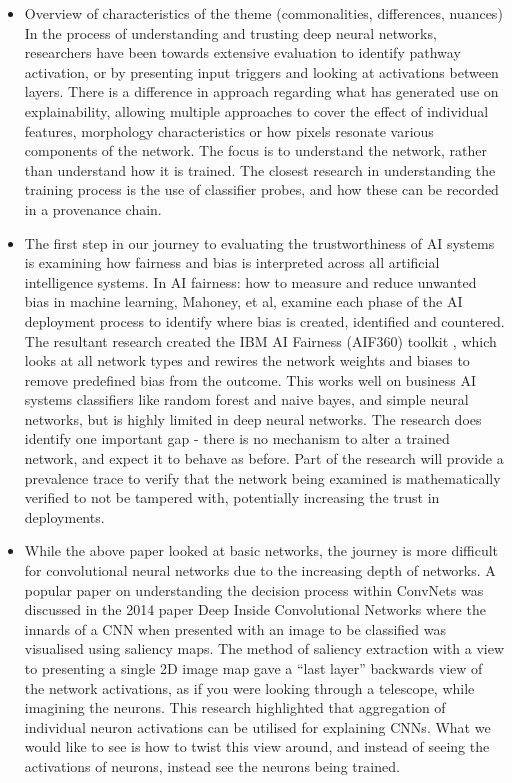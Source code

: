 \begin{itemize}
    \item Overview of characteristics of the theme (commonalities, differences, nuances)
    In the process of understanding and trusting deep neural networks, researchers have been towards extensive evaluation to identify pathway activation, or by presenting input triggers and looking at activations between layers. There is a difference in approach regarding what has generated use on explainability, allowing multiple approaches to cover the effect of individual features, morphology characteristics or how pixels resonate various components of the network. The focus is to understand the network, rather than understand how it is trained. The closest research in understanding the training process is the use of classifier probes, and how these can be recorded in a provenance chain.

    \item The first step in our journey to evaluating the trustworthiness of AI systems is examining how fairness and bias is interpreted across all artificial intelligence systems. In AI fairness: how to measure and reduce unwanted bias in machine learning, Mahoney, et al, examine each phase of the AI deployment process to identify where bias is created, identified and countered. The resultant research created the IBM AI Fairness (AIF360) toolkit \cite{mahoney_ai_2020}, which looks at all network types and rewires the network weights and biases to remove predefined bias from the outcome. This works well on business AI systems classifiers like random forest and naive bayes, and simple neural networks, but is highly limited in deep neural networks. The research does identify one important gap - there is no mechanism to alter a trained network, and expect it to behave as before. Part of the research will provide a prevalence trace to verify that the network being examined is mathematically verified to not be tampered with, potentially increasing the trust in deployments.

    \item While the above paper looked at basic networks, the journey is more difficult for convolutional neural networks due to the increasing depth of networks. A popular paper on understanding the decision process within ConvNets was discussed in the 2014 paper Deep Inside Convolutional Networks \cite{simonyan_deep_2014} where the innards of a CNN when presented with an image to be classified was visualised using saliency maps. The method of saliency extraction with a view to presenting a single 2D image map gave a “last layer” backwards view of the network activations, as if you were looking through a telescope, while imagining the neurons. This research highlighted that aggregation of individual neuron activations can be utilised for explaining CNNs. What we would like to see is how to twist this view around, and instead of seeing the activations of neurons, instead see the neurons being trained.


\end{itemize}
